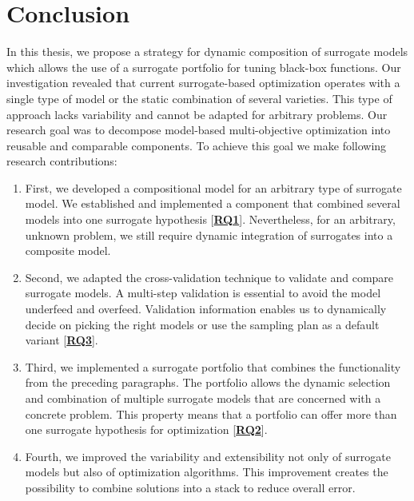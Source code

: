\chapter{Conclusion}\label{sec:conclusion}

In this thesis, we propose a strategy for dynamic composition of surrogate models which allows the use of a surrogate portfolio for tuning black-box functions.
Our investigation revealed that current surrogate-based optimization operates with a single type of model or the static combination of several varieties. This type of approach lacks variability and cannot be adapted for arbitrary problems. Our research goal was to decompose model-based multi-objective optimization into reusable and comparable components. 
To achieve this goal we make following research contributions:

\begin{enumerate}
    \item First, we developed a compositional model for an arbitrary type of surrogate model. We established and implemented a component that combined several models into one surrogate hypothesis  [\textbf{\hyperref[RQ1]{RQ1}}]. Nevertheless, for an arbitrary, unknown problem, we still require dynamic integration of surrogates into a composite model.
    \item Second, we adapted the cross-validation technique to validate and compare surrogate models. A multi-step validation is essential to avoid the model underfeed and overfeed. Validation information enables us to dynamically decide on picking the right models or use the sampling plan as a default variant [\textbf{\hyperref[RQ3]{RQ3}}].
    \item Third, we implemented a surrogate portfolio that combines the functionality from the preceding paragraphs. The portfolio allows the dynamic selection and combination of multiple surrogate models that are concerned with a concrete problem. This property means that a portfolio can offer more than one surrogate hypothesis for optimization [\textbf{\hyperref[RQ2]{RQ2}}].
    \item Fourth, we improved the variability and extensibility not only of surrogate models but also of optimization algorithms. This improvement creates the possibility to combine solutions into a stack to reduce overall error.
\end{enumerate}


